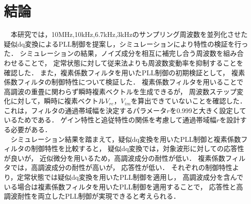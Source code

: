 
\chapter{結論}
\label{chap:結論}

　本研究では，10MHz,10kHz,6.7kHz,3kHzのサンプリング周波数を並列化させた
疑似dq変換によるPLL制御を提案し，シミュレーションにより特性の検証を行った．
シミュレーションの結果，ノイズ成分を相互に補完し合う周波数を組み合わせることで，
定常状態に対して従来法よりも周波数変動率を抑制することを確認した．
また，複素係数フィルタを用いたPLL制御の初期検証として，
複素係数フィルタの制御特性について検証した．
複素係数フィルタを用いることで高調波の重畳に関わらず瞬時複素ベクトルを生成できるが，
周波数ステップ変化に対して，瞬時に複素ベクトル$V_{re} ，V_{im}$を算出できていないことを確認した．
これは，フィルタの通過帯域幅を決定するパラメータ$r$を0.999と大きく設定しているためである．
ゲイン特性と追従特性の関係を考慮して通過帯域幅$r$を設計する必要がある．\\
　シミュレーション結果を踏まえて，疑似dq変換を用いたPLL制御と複素係数フィルタの制御特性を比較すると，
疑似dq変換では，対象波形に対しての応答性が良いが，
近似微分を用いるため，高調波成分の耐性が低い．
複素係数フィルタでは，高調波成分の耐性が高いが，
応答性が低い．
それぞれの制御特性より，定常状態では疑似dq変換を用いたPLL制御を適用し，
高調波成分を含んでいる場合は複素係数フィルタを用いたPLL制御を適用することで，
応答性と高調波耐性を両立したPLL制御が実現できると考えられる．

 